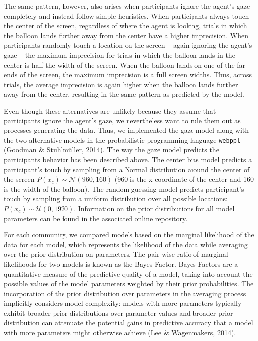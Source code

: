 \documentclass[
  man,floatsintext]{apa7}
\begin{document}
The same pattern, however, also arises when participants ignore the agent's gaze completely and instead follow simple heuristics. When participants always touch the center of the screen, regardless of where the agent is looking, trials in which the balloon lands further away from the center have a higher imprecision. When participants randomly touch a location on the screen -- again ignoring the agent's gaze -- the maximum imprecision for trials in which the balloon lands in the center is half the width of the screen. When the balloon lands on one of the far ends of the screen, the maximum imprecision is a full screen widths. Thus, across trials, the average imprecision is again higher when the balloon lands further away from the center, resulting in the same pattern as predicted by the model.

Even though these alternatives are unlikely because they assume that participants ignore the agent's gaze, we nevertheless want to rule them out as processes generating the data. Thus, we implemented the gaze model along with the two alternative models in the probabilistic programming language \texttt{webppl} (Goodman \& Stuhlmüller, 2014). The way the gaze model predicts the participants behavior has been described above. The center bias model predicts a participant's touch by sampling from a Normal distribution around the center of the screen \(P(x_c) \sim \mathcal{N}(960, 160)\) (960 is the x-coordinate of the center and 160 is the width of the balloon). The random guessing model predicts participant's touch by sampling from a uniform distribution over all possible locations: \(P(x_c) \sim \mathcal{U}(0, 1920)\). Information on the prior distributions for all model parameters can be found in the associated online repository.

For each community, we compared models based on the marginal likelihood of the data for each model, which represents the likelihood of the data while averaging over the prior distribution on parameters. The pair-wise ratio of marginal likelihoods for two models is known as the Bayes Factor. Bayes Factors are a quantitative measure of the predictive quality of a model, taking into account the possible values of the model parameters weighted by their prior probabilities. The incorporation of the prior distribution over parameters in the averaging process implicitly considers model complexity: models with more parameters typically exhibit broader prior distributions over parameter values and broader prior distribution can attenuate the potential gains in predictive accuracy that a model with more parameters might otherwise achieve (Lee \& Wagenmakers, 2014).
\end{document}
